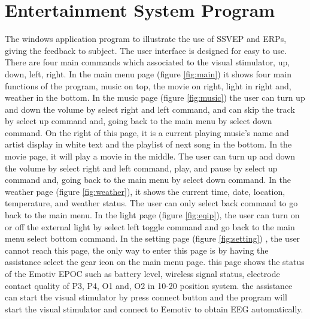 \section{Entertainment System Program}
\hspace{1.5cm}The windows application program to illustrate the use of SSVEP and ERPs, giving the feedback to subject. The user interface is designed for easy to use. There are four main commands which associated to the visual stimulator, up, down, left, right. In the main menu page (figure \ref{fig:main}) it shows four main functions of the program, music on top, the movie on right, light in right and, weather in the bottom. In the music page (figure \ref{fig:music}) the user can turn up and down the volume by select right and left command, and can skip the track by select up command and, going back to the main menu by select down command. On the right of this page, it is a current playing music's name and artist display in white text and the playlist of next song in the bottom. In the movie page, it will play a movie in the middle. The user can turn up and down the volume by select right and left command, play, and pause by select up command and, going back to the main menu by select down command.
\pagebreak In the weather page (figure \ref{fig:weather}), it shows the current time, date, location, temperature, and weather status. The user can only select back command to go back to the main menu. In the light page (figure \ref{fig:eqip}), the user can turn on or off the external light by select left toggle command and go back to the main menu select bottom command. In the setting page (figure \ref{fig:setting}) , the user cannot reach this page, the only way to enter this page is by having the assistance select the gear icon on the main menu page. this page shows the status of the Emotiv EPOC such as battery level, wireless signal status, electrode contact quality of P3, P4, O1 and, O2 in 10-20 position system. the assistance can start the visual stimulator by press connect button and the program will start the visual stimulator and connect to Eemotiv to obtain EEG automatically.




